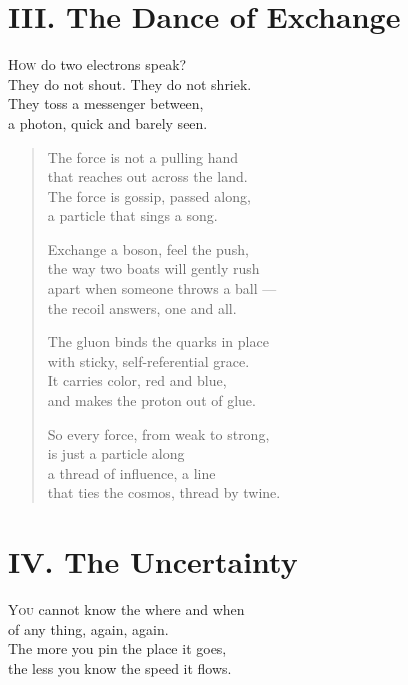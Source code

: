 \documentclass[11pt]{book}
\begin{document}
\section*{III. The Dance of Exchange}
\lettrine{H}{ow} do two electrons speak?\\
They do not shout. They do not shriek.\\
They toss a messenger between,\\
a photon, quick and barely seen.

\begin{verse}
The force is not a pulling hand\\
that reaches out across the land.\\
The force is gossip, passed along,\\
a particle that sings a song.

Exchange a boson, feel the push,\\
the way two boats will gently rush\\
apart when someone throws a ball ---\\
the recoil answers, one and all.

The gluon binds the quarks in place\\
with sticky, self-referential grace.\\
It carries color, red and blue,\\
and makes the proton out of glue.

So every force, from weak to strong,\\
is just a particle along\\
a thread of influence, a line\\
that ties the cosmos, thread by twine.
\end{verse}

\section*{IV. The Uncertainty}
\lettrine{Y}{ou} cannot know the where and when\\
of any thing, again, again.\\
The more you pin the place it goes,\\
the less you know the speed it flows.
\end{document}
